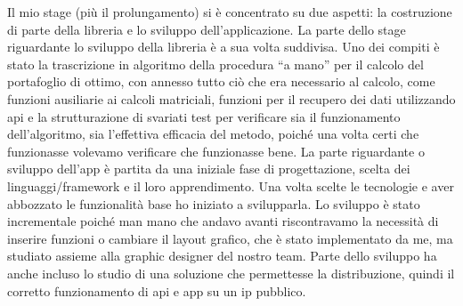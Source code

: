 Il mio stage (più il prolungamento) si è concentrato su due aspetti: la costruzione di parte della libreria e lo sviluppo dell’applicazione. 
La parte dello stage riguardante lo sviluppo della libreria è a sua volta suddivisa. Uno dei compiti è stato la trascrizione in algoritmo della procedura “a mano” per il calcolo del portafoglio di ottimo, con annesso tutto ciò che era necessario al calcolo, come funzioni ausiliarie ai calcoli matriciali, funzioni per il recupero dei dati utilizzando api e la strutturazione di svariati test per verificare sia il funzionamento dell’algoritmo, sia l’effettiva efficacia del metodo, poiché una volta certi che funzionasse volevamo verificare che funzionasse bene. 
La parte riguardante o sviluppo dell’app è partita da una iniziale fase di progettazione, scelta dei linguaggi/framework e il loro apprendimento. Una volta scelte le tecnologie e aver abbozzato le funzionalità base ho iniziato a svilupparla. Lo sviluppo è stato incrementale poiché man mano che andavo avanti riscontravamo la necessità di inserire funzioni o cambiare il layout grafico, che è stato implementato da me, ma studiato assieme alla graphic designer del nostro team. Parte dello sviluppo ha anche incluso lo studio di una soluzione che permettesse la distribuzione, quindi il corretto funzionamento di api e app su un ip pubblico.